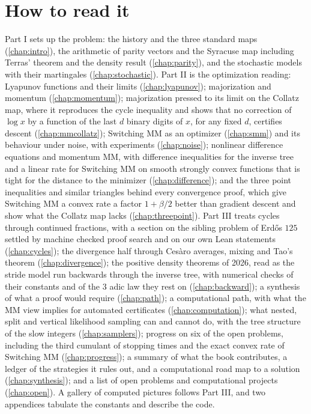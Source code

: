 \section*{How to read it}

Part I sets up the problem: the history and the three standard maps (\cref{chap:intro}), the arithmetic of parity vectors and the Syracuse map including Terras' theorem and the density result (\cref{chap:parity}), and the stochastic models with their martingales (\cref{chap:stochastic}). Part II is the optimization reading: Lyapunov functions and their limits (\cref{chap:lyapunov}); majorization and momentum (\cref{chap:momentum}); majorization pressed to its limit on the Collatz map, where it reproduces the cycle inequality and shows that no correction of $\log x$ by a function of the last $d$ binary digits of $x$, for any fixed $d$, certifies descent (\cref{chap:mmcollatz}); Switching MM as an optimizer (\cref{chap:smm}) and its behaviour under noise, with experiments (\cref{chap:noise}); nonlinear difference equations and momentum MM, with difference inequalities for the inverse tree and a linear rate for Switching MM on smooth strongly convex functions that is tight for the distance to the minimizer (\cref{chap:difference}); and the three point inequalities and similar triangles behind every convergence proof, which give Switching MM a convex rate a factor $1+\beta/2$ better than gradient descent and show what the Collatz map lacks (\cref{chap:threepoint}). Part III treats cycles through continued fractions, with a section on the sibling problem of Erd\H{o}s $125$ settled by machine checked proof search and on our own Lean statements (\cref{chap:cycles}); the divergence half through Ces\`aro averages, mixing and Tao's theorem (\cref{chap:divergence}); the positive density theorems of 2026, read as the stride model run backwards through the inverse tree, with numerical checks of their constants and of the $3$ adic law they rest on (\cref{chap:backward}); a synthesis of what a proof would require (\cref{chap:path}); a computational path, with what the MM view implies for automated certificates (\cref{chap:computation}); what nested, split and vertical likelihood sampling can and cannot do, with the tree structure of the slow integers (\cref{chap:samplers}); progress on six of the open problems, including the third cumulant of stopping times and the exact convex rate of Switching MM (\cref{chap:progress}); a summary of what the book contributes, a ledger of the strategies it rules out, and a computational road map to a solution (\cref{chap:synthesis}); and a list of open problems and computational projects (\cref{chap:open}). A gallery of computed pictures follows Part III, and two appendices tabulate the constants and describe the code.

